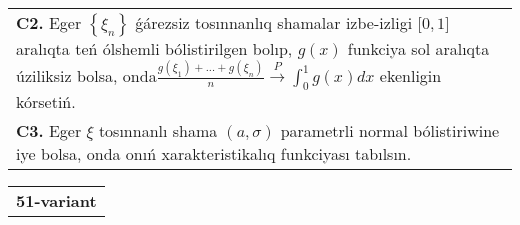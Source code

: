 \documentclass{article}
\begin{document}
\begin{tabular}{m{17cm}}
 \\
\textbf{C2.} Eger \(\left\{ \xi_{n} \right\}\) ǵárezsiz tosınnanlıq shamalar izbe-izligi \(\lbrack 0,1\rbrack\) aralıqta teń ólshemli bólistirilgen bolıp, \(g(x)\) funkciya sol aralıqta úziliksiz bolsa, onda\(\frac{g\left( \xi_{1} \right) + ... + g\left( \xi_{n} \right)}{n}\overset{P}{\rightarrow}\int_{0}^{1}{g(x)}dx\) ekenligin kórsetiń.
 \\
\textbf{C3.} Eger \(\xi\) tosınnanlı shama \((a,\sigma)\) parametrli normal bólistiriwine iye bolsa, onda onıń xarakteristikalıq funkciyası tabılsın.
 \\

\end{tabular}
\vspace{1cm}


\begin{tabular}{m{17cm}}
\textbf{51-variant}
\newline


\end{tabular}
\end{document}
